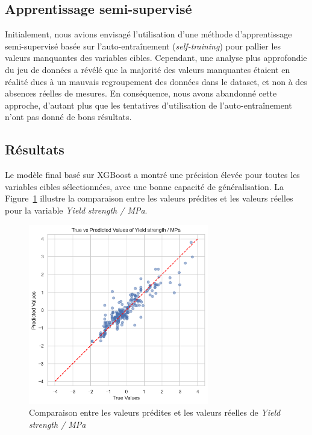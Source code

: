 \documentclass{article}
\begin{document}
\subsection{Apprentissage semi-supervisé}

Initialement, nous avions envisagé l’utilisation d’une méthode d’apprentissage semi-supervisé basée sur l’auto-entraînement (\textit{self-training}) pour pallier les valeurs manquantes des variables cibles. Cependant, une analyse plus approfondie du jeu de données a révélé que la majorité des valeurs manquantes étaient en réalité dues à un mauvais regroupement des données dans le dataset, et non à des absences réelles de mesures. En conséquence, nous avons abandonné cette approche, d’autant plus que les tentatives d’utilisation de l’auto-entraînement n’ont pas donné de bons résultats.

\subsection{Résultats}

Le modèle final basé sur XGBoost a montré une précision élevée pour toutes les variables cibles sélectionnées, avec une bonne capacité de généralisation. La Figure~\ref{fig:predictions_vs_true} illustre la comparaison entre les valeurs prédites et les valeurs réelles pour la variable \textit{Yield strength / MPa}.

\begin{figure}[H]
    \centering
    \includegraphics[width=0.7\textwidth]{images/predictions_vs_true.png}
    \caption{Comparaison entre les valeurs prédites et les valeurs réelles de \textit{Yield strength / MPa}}
    \label{fig:predictions_vs_true}
\end{figure}
\end{document}
